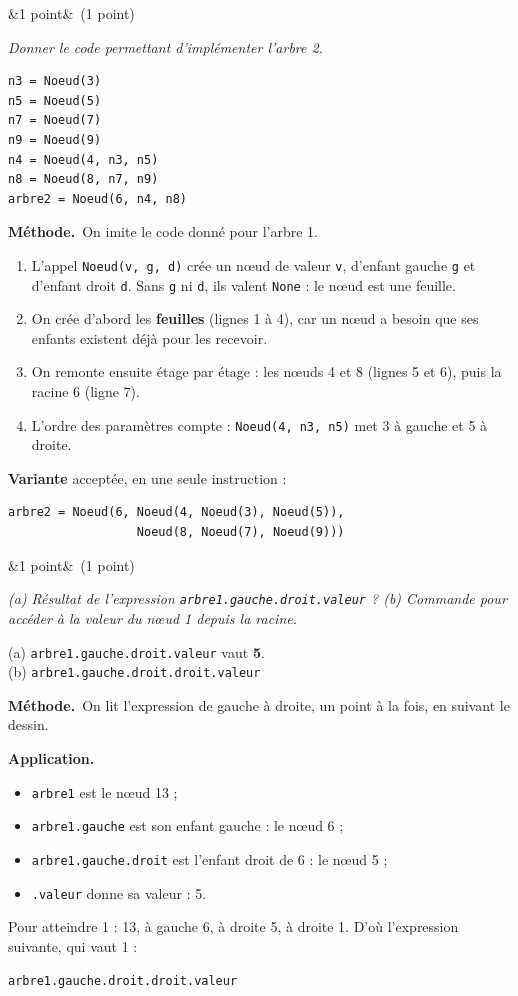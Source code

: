 \documentclass[11pt, a4paper]{exam}
\newcommand{\code}[1]{\texttt{#1}}
\newcommand{\Q}[3]{\par\needspace{5\baselineskip}\bigskip\noindent{\large\bfseries Question #1}\ifx&#2&\else\ \textnormal{(#2)}\fi\par\nopagebreak\smallskip\noindent\textit{#3}\par\nopagebreak\smallskip}
\newcommand{\methode}{\par\noindent\textbf{Méthode.}\ }
\newcommand{\application}{\par\noindent\textbf{Application.}\ }
\begin{document}
\Q{2}{1 point}{Donner le code permettant d'implémenter l'arbre 2.}
\begin{reponse}
\begin{lstlisting}
n3 = Noeud(3)
n5 = Noeud(5)
n7 = Noeud(7)
n9 = Noeud(9)
n4 = Noeud(4, n3, n5)
n8 = Noeud(8, n7, n9)
arbre2 = Noeud(6, n4, n8)
\end{lstlisting}
\end{reponse}
\methode On imite le code donné pour l'arbre 1.
\begin{enumerate}
\item L'appel \code{Noeud(v, g, d)} crée un nœud de valeur \code{v}, d'enfant gauche \code{g} et d'enfant droit \code{d}. Sans \code{g} ni \code{d}, ils valent \code{None} : le nœud est une feuille.
\item On crée d'abord les \textbf{feuilles} (lignes 1 à 4), car un nœud a besoin que ses enfants existent déjà pour les recevoir.
\item On remonte ensuite étage par étage : les nœuds 4 et 8 (lignes 5 et 6), puis la racine 6 (ligne 7).
\item L'ordre des paramètres compte : \code{Noeud(4, n3, n5)} met 3 à gauche et 5 à droite.
\end{enumerate}
\textbf{Variante} acceptée, en une seule instruction :
\begin{lstlisting}
arbre2 = Noeud(6, Noeud(4, Noeud(3), Noeud(5)),
                  Noeud(8, Noeud(7), Noeud(9)))
\end{lstlisting}

\Q{3}{1 point}{(a) Résultat de l'expression \code{arbre1.gauche.droit.valeur} ? (b) Commande pour accéder à la valeur du nœud 1 depuis la racine.}
\begin{reponse}
(a) \code{arbre1.gauche.droit.valeur} vaut \textbf{5}. \\
(b) \code{arbre1.gauche.droit.droit.valeur}
\end{reponse}
\methode On lit l'expression de gauche à droite, un point à la fois, en suivant le dessin.
\application
\begin{itemize}
\item \code{arbre1} est le nœud 13 ;
\item \code{arbre1.gauche} est son enfant gauche : le nœud 6 ;
\item \code{arbre1.gauche.droit} est l'enfant droit de 6 : le nœud 5 ;
\item \code{.valeur} donne sa valeur : 5.
\end{itemize}
Pour atteindre 1 : 13, à gauche 6, à droite 5, à droite 1. D'où l'expression suivante, qui vaut 1 :
\begin{center}\code{arbre1.gauche.droit.droit.valeur}\end{center}
\end{document}
